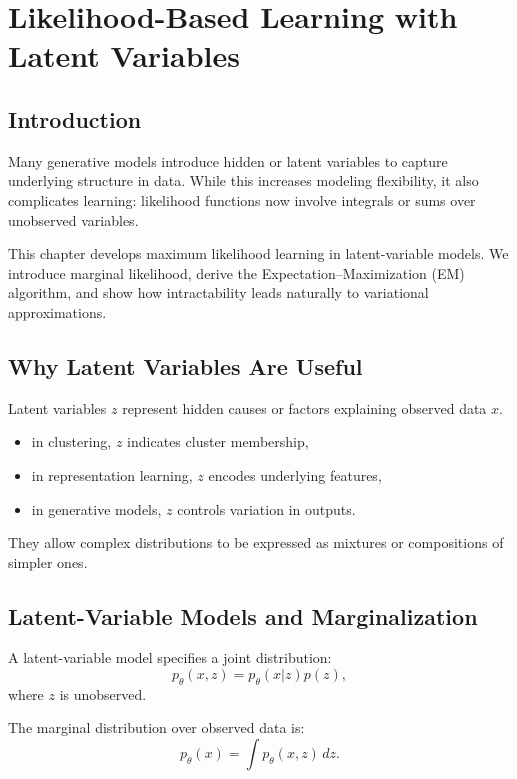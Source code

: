 \chapter{Likelihood-Based Learning with Latent Variables}

\section{Introduction}

Many generative models introduce hidden or latent variables to capture underlying structure in data. While this increases modeling flexibility, it also complicates learning: likelihood functions now involve integrals or sums over unobserved variables.

This chapter develops maximum likelihood learning in latent-variable models. We introduce marginal likelihood, derive the Expectation--Maximization (EM) algorithm, and show how intractability leads naturally to variational approximations.

\section{Why Latent Variables Are Useful}

Latent variables $z$ represent hidden causes or factors explaining observed data $x$.

\begin{itemize}
    \item in clustering, $z$ indicates cluster membership,
    \item in representation learning, $z$ encodes underlying features,
    \item in generative models, $z$ controls variation in outputs.
\end{itemize}

They allow complex distributions to be expressed as mixtures or compositions of simpler ones.

\section{Latent-Variable Models and Marginalization}

\begin{definition}
A latent-variable model specifies a joint distribution:
\[
p_\theta(x,z) = p_\theta(x|z)p(z),
\]
where $z$ is unobserved.
\end{definition}

The marginal distribution over observed data is:
\[
p_\theta(x) = \int p_\theta(x,z)\,dz.
\]

